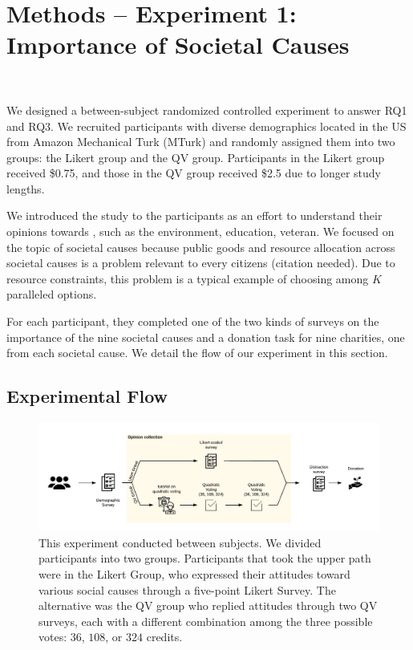 \section{Methods -- Experiment 1: Importance of Societal Causes}~\label{method_exp1}

We designed a between-subject randomized controlled experiment to answer RQ1 and RQ3. We recruited participants with diverse demographics located in the US from Amazon Mechanical Turk (MTurk) and randomly assigned them into two groups: the Likert group and the QV group. Participants in the Likert group received \$0.75, and those in the QV group received \$2.5 due to longer study lengths. 

We introduced the study to the participants as an effort to understand their opinions towards , such as the environment, education, veteran. We focused on the topic of societal causes because public goods and resource allocation across societal causes is a problem relevant to every citizens (citation needed). Due to resource constraints, this problem is a typical example of choosing among $K$ paralleled options.

For each participant, they completed one of the two kinds of surveys on the importance of the nine societal causes and a donation task for nine charities, one from each societal cause. We detail the flow of our experiment in this section.



\subsection{Experimental Flow}
\begin{figure}[htpb]
    \centering
    \includegraphics[width=\textwidth, keepaspectratio=true]{content/image/exp1_flow.pdf}
    \caption{
        This experiment conducted between subjects. We divided participants into two groups. Participants that took the upper path were in the Likert Group, who expressed their attitudes toward various social causes through a five-point Likert Survey. The alternative was the QV group who replied attitudes through two QV surveys, each with a different combination among the three possible votes: $36$, $108$, or $324$ credits.
    }
    \label{fig:exp1_image_flow}
\end{figure}

